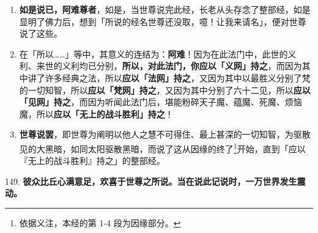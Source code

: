 \begin{enumerate}\item \textbf{如是说已，阿难尊者}，如是，当世尊说完此经，长老从头存念了整部经，如是显明了佛力后，想到「所说的经名世尊还没取，噫！让我来请名」，便对世尊说了这些。
\item 在「所以……」等中，其意义的连结为：\textbf{阿难}！因为在此法门中，此世的义利、来世的义利均已分别，\textbf{所以，对此法门，你应以「义网」持之}，而因为其中讲了许多经典之法，所以\textbf{应以「法网」持之}，又因为其中以最胜义分别了梵的一切知智，所以\textbf{应以「梵网」持之}，又因为其中分别了六十二见，所以\textbf{应以「见网」持之}，而因为听闻此法门后，堪能粉碎天子魔、蕴魔、死魔、烦恼魔，所以\textbf{应以「无上的战斗胜利」持之}！
\item \textbf{世尊说罢}，即世尊为阐明以他人之慧不可得住、最上甚深的一切知智，为驱散见的大黑暗，如同太阳驱散黑暗，而说了这从因缘的终了\footnote{依据义注，本经的第 1-4 段为因缘部分。}开始，直到「应以『无上的战斗胜利』持之」的整部经。\end{enumerate}

{\Large 149.} \textbf{彼众比丘心满意足，欢喜于世尊之所说。当在说此记说时，一万世界发生震动。}

